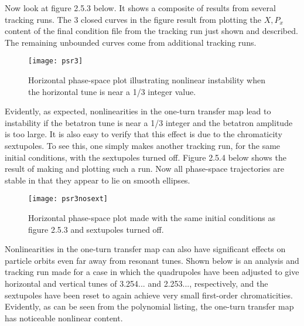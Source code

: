      Now look at figure 2.5.3 below.  It shows a composite of results from
several tracking runs.  The 3 closed curves in the figure result from
plotting the $X,P_x$  content of the final condition file from the tracking
run just shown and described.  The remaining unbounded curves come from
additional tracking runs.


\begin{figure}[hbp]
  \centering
  \texttt{[image: psr3]}
  \caption{ Horizontal phase-space plot illustrating
                  nonlinear instability when the horizontal
                      tune is near a 1/3 integer value.}
\end{figure}

     Evidently, as expected, nonlinearities in the one-turn transfer map
lead to instability if the betatron tune is near a 1/3 integer and the
betatron amplitude is too large.  It is also easy to verify that this
effect is due to the chromaticity sextupoles.  To see this, one simply
makes another \Mary tracking run, for the same initial conditions, with
the sextupoles turned off.  Figure 2.5.4 below shows the result of making
and plotting such a run. Now all phase-space trajectories are stable in
that they appear to lie on smooth ellipses.


\begin{figure}[htp]
  \centering
  \texttt{[image: psr3nosext]}
  \caption{Horizontal phase-space plot made with the same
        initial conditions as figure 2.5.3 and sextupoles turned off.}
\end{figure}

     Nonlinearities in the one-turn transfer map can also have significant
effects on particle orbits even far away from resonant tunes.  Shown below
is an analysis and tracking run made for a case in which the quadrupoles
have been adjusted to give horizontal and vertical tunes of 3.254... and
2.253..., respectively, and the sextupoles have been reset to again achieve
very small first-order chromaticities.  Evidently, as can be seen from the
polynomial listing, the one-turn transfer map has noticeable nonlinear
content.

